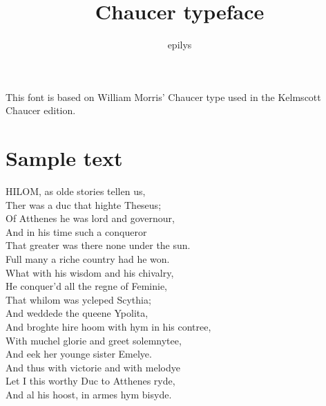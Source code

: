 \documentclass{article}
\title{Chaucer typeface}
\author{epilys}
\begin{document}
\maketitle
\thispagestyle{empty}
This font is based on William Morris' Chaucer type used in the Kelmscott Chaucer edition.
\section*{Sample text}%
\reversemarginpar{}%
\marginpar{\textcolor{sidered}{\\ \\ The\\ Knyghtes\\ Tale}}%
\begin{multicols}{2}%
HILOM, as olde stories tellen us,\\
Ther was a duc that highte Theseus;\\
Of Atthenes he was lord and governour,\\
And in his time such a conqueror\\
That greater was there none under the sun.\\
Full many a riche country had he won.\\
What with his wisdom and his chivalry,\\
He conquer'd all the regne of Feminie,\\
That whilom was ycleped Scythia;\\
And weddede the queene Ypolita,\\
And broghte hire hoom with hym in his contree,\\
With muchel glorie and greet solemnytee,\\
And eek her younge sister Emelye.\\
And thus with victorie and with melodye\\
Let I this worthy Duc to Atthenes ryde,\\
And al his hoost, in armes hym bisyde.
\columnbreak%


\end{multicols}
\end{document}

